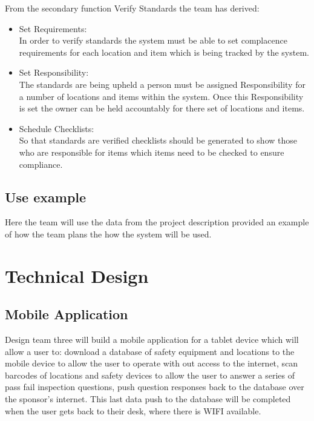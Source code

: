 \documentclass[Letter,11pt]{article}
\begin{document}
		From the secondary function Verify Standards the team has derived:
		\begin{itemize}
			\item Set Requirements:\\
			In order to verify standards the system must be able to set complacence requirements for each location and item which is being tracked by the system.
			\item Set Responsibility:\\
			The standards are being upheld a person must be assigned Responsibility for a number of locations and items within the system. Once this Responsibility is set the owner can be held accountably for there set of locations and items. 
			\item Schedule Checklists:\\
			So that standards are verified  checklists should be generated to show those who are responsible for items which items need to be checked to ensure compliance.
		\end{itemize}
		
	\subsection{Use example}
		Here the team will use the data from the project description provided an example of how the team plans the how the system will be used.
		  

		


\section{Technical Design}

	\subsection{Mobile Application}
	Design team three will build a mobile application for a tablet device which will allow a user to: download a database of safety equipment and locations to the mobile device to allow the user to operate with out access to the internet, scan barcodes of locations and safety devices to allow the user to answer a series of pass fail inspection questions, push question responses back to the database over the sponsor's internet. This last data push to the database will be completed when the user gets back to their desk, where there is WIFI available.
\end{document}
